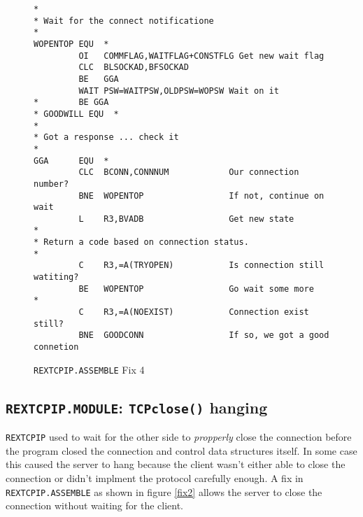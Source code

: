 \begin{figure}
\caption{{\tt REXTCPIP.ASSEMBLE} Fix 4}\label{fix4}
\rule{0mm}{2mm}
\begin{center}
\begin{small}
\begin{verbatim}
*
* Wait for the connect notificatione
*
WOPENTOP EQU  *
         OI   COMMFLAG,WAITFLAG+CONSTFLG Get new wait flag
         CLC  BLSOCKAD,BFSOCKAD
         BE   GGA
         WAIT PSW=WAITPSW,OLDPSW=WOPSW Wait on it
*        BE GGA
* GOODWILL EQU  *
*
* Got a response ... check it
*
GGA      EQU  *
         CLC  BCONN,CONNNUM            Our connection number?
         BNE  WOPENTOP                 If not, continue on wait
         L    R3,BVADB                 Get new state
*
* Return a code based on connection status.
*
         C    R3,=A(TRYOPEN)           Is connection still watiting?
         BE   WOPENTOP                 Go wait some more
*
         C    R3,=A(NOEXIST)           Connection exist still?
         BNE  GOODCONN                 If so, we got a good connetion
\end{verbatim}
\end{small}
\end{center}
\rule{0mm}{2mm}
\end{figure}



\subsection{{\tt REXTCPIP.MODULE}: {\tt TCPclose()} hanging}


{\tt REXTCPIP} used to wait for the other side to {\em propperly} close the
connection before the program closed the connection and control data
structures itself.  In some case this caused the server to hang because
the client wasn't either able to close the connection or didn't implment
the protocol carefully enough.  A fix in {\tt REXTCPIP.ASSEMBLE} as shown
in figure \ref{fix2} allows the server to close the connection without
waiting for the client.



